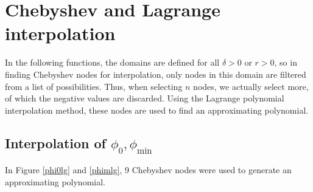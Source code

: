 \section{Chebyshev and Lagrange interpolation}

In the following functions, the domains are defined for all $\delta>0$ or $r>0$, so in finding Chebyshev nodes for interpolation, only nodes
in this domain are filtered from a list of possibilities. Thus, when selecting $n$ nodes, we actually select more, of which the negative values are discarded.
Using the Lagrange polynomial interpolation method, these nodes are used to find an approximating polynomial.

\subsection{Interpolation of \texorpdfstring{$\phi_0,\phi_\mathrm{min}$}{}}

In Figure \ref{phi0lg} and \ref{phimlg}, 9 Chebyshev nodes were used to generate an approximating polynomial.

